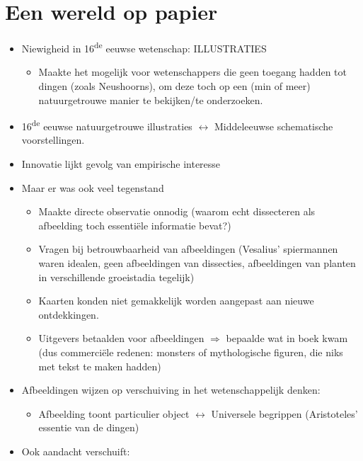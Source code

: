 \documentclass{article}
\begin{document}
  \newpage
  \section{Een wereld op papier}
    \begin{itemize}
      \item Niewigheid in 16\textsuperscript{de} eeuwse wetenschap: ILLUSTRATIES
      \begin{itemize}
        \item Maakte het mogelijk voor wetenschappers die geen toegang hadden tot dingen (zoals Neushoorns), om deze toch op een (min of meer) natuurgetrouwe manier te bekijken/te onderzoeken.
      \end{itemize}
      \item 16\textsuperscript{de} eeuwse natuurgetrouwe illustraties $\leftrightarrow$ Middeleeuwse schematische voorstellingen.
      \item Innovatie lijkt gevolg van empirische interesse
      \item Maar er was ook veel tegenstand
      \begin{itemize}
        \item Maakte directe observatie onnodig (waarom echt dissecteren als afbeelding toch essenti\"ele informatie bevat?)
        \item Vragen bij betrouwbaarheid van afbeeldingen (Vesalius' spiermannen waren idealen, geen afbeeldingen van dissecties, afbeeldingen van planten in verschillende groeistadia tegelijk)
        \item Kaarten konden niet gemakkelijk worden aangepast aan nieuwe ontdekkingen.
        \item Uitgevers betaalden voor afbeeldingen $\Rightarrow$ bepaalde wat in boek kwam (dus commerci\"ele redenen: monsters of mythologische figuren, die niks met tekst te maken hadden)
      \end{itemize}
      \item Afbeeldingen wijzen op verschuiving in het wetenschappelijk denken:
      \begin{itemize}
        \item Afbeelding toont particulier object $\leftrightarrow$ Universele begrippen (Aristoteles' essentie van de dingen)
      \end{itemize}
      \item Ook aandacht verschuift:

\end{itemize}
\end{document}
